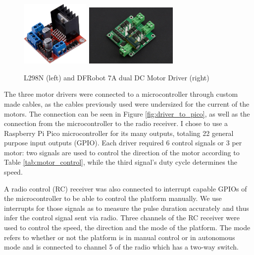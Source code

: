 \documentclass[12pt]{article}
\begin{document}
            
            \begin{figure}[h]
                \centering
                \includegraphics[width=0.3\textwidth]{Images/olddrivers.jpg}
                \includegraphics[width=0.4\textwidth]{Images/newdrivers.jpg}
                \caption{L298N (left) and DFRobot 7A dual DC Motor Driver (right)}
                \label{fig:drivers_comparison}
            \end{figure}

            The three motor drivers were connected to a microcontroller through custom made cables, as the cables previously used were undersized for the current of the motors. The connection can be seen in Figure \ref{fig:driver_to_pico}, as well as the connection from the microcontroller to the radio receiver.
            I chose to use a Raspberry Pi Pico microcontroller for its many outputs, totaling 22 general purpose input outputs (GPIO). Each driver required 6 control signals or 3 per motor: two signals are used to control the direction of the motor according to Table \ref{tab:motor_control}, while the third signal's duty cycle determines the speed.

            A radio control (RC) receiver was also connected to interrupt capable GPIOs of the microcontroller to be able to control the platform manually. We use interrupts for those signals as to measure the pulse duration accurately and thus infer the control signal sent via radio. Three channels of the RC receiver were used to control the speed, the direction and the mode of the platform. The mode refers to whether or not the platform is in manual control or in autonomous mode and is connected to channel 5 of the radio which has a two-way switch.
\end{document}
